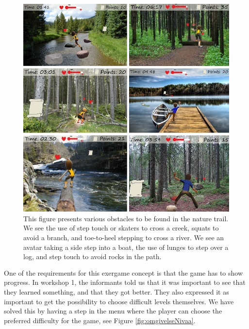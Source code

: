 \begin{figure} [H]
\centering
\includegraphics[scale=0.6]{hindringerEng.jpg}
\caption[Nature trail - obstacles]{This figure presents various obstacles to be found in the nature trail. We see the use of step touch or skaters to cross a creek, squats to avoid a branch, and toe-to-heel stepping to cross a river. We see an avatar taking a side step into a boat, the use of lunges to step over a log, and step touch to avoid rocks in the path.}
\label{fig:hindring}
\end{figure}

One of the requirements for this exergame concept is that the game has to show progress. In workshop 1, the informants told us that it was important to see that they learned something, and that they got better. They also expressed it as important to get the possibility to choose difficult levels themselves. We have solved this by having a step in the menu where the player can choose the preferred difficulty for the game, see Figure \ref{fig:omgivelseNivaa}. 

